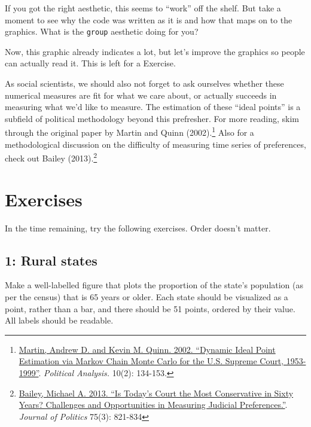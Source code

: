 \documentclass[]{book}
\newenvironment{Shaded}{\begin{snugshade}}{\end{snugshade}}
\let\rmarkdownfootnote\footnote%
\def\footnote{\protect\rmarkdownfootnote}
\theoremstyle{definition}
\theoremstyle{definition}
\theoremstyle{definition}
\theoremstyle{remark}
\begin{document}
\begin{Shaded}
\begin{Highlighting}[]
\begin{Shaded}
\begin{Highlighting}[]
\begin{Shaded}
\begin{Highlighting}[]
If you got the right aesthetic, this seems to ``work'' off the shelf. But take a moment to see why the code was written as it is and how that maps on to the graphics. What is the \texttt{group} aesthetic doing for you?

Now, this graphic already indicates a lot, but let's improve the graphics so people can actually read it. This is left for a Exercise.

As social scientists, we should also not forget to ask ourselves whether these numerical measures are fit for what we care about, or actually succeeds in measuring what we'd like to measure. The estimation of these ``ideal points'' is a subfield of political methodology beyond this prefresher. For more reading, skim through the original paper by Martin and Quinn (2002).\footnote{\href{http://mqscores.lsa.umich.edu/media/pa02.pdf}{Martin, Andrew D. and Kevin M. Quinn. 2002. ``Dynamic Ideal Point Estimation via Markov Chain Monte Carlo for the U.S. Supreme Court, 1953-1999''}. \emph{Political Analysis.} 10(2): 134-153.} Also for a methodological discussion on the difficulty of measuring time series of preferences, check out Bailey (2013).\footnote{\href{https://michaelbailey.georgetown.domains/wp-content/uploads/2018/05/JOP_proofs_June2013.pdf}{Bailey, Michael A. 2013. ``Is Today's Court the Most Conservative in Sixty Years? Challenges and Opportunities in Measuring Judicial Preferences.''}. \emph{Journal of Politics} 75(3): 821-834}

\hypertarget{exercises-2}{%
\section*{Exercises}\label{exercises-2}}

In the time remaining, try the following exercises. Order doesn't matter.

\hypertarget{rural-states}{%
\subsection*{1: Rural states}\label{rural-states}}

Make a well-labelled figure that plots the proportion of the state's population (as per the census) that is 65 years or older. Each state should be visualized as a point, rather than a bar, and there should be 51 points, ordered by their value. All labels should be readable.


\end{Highlighting}
\end{Shaded}
\end{Highlighting}
\end{Shaded}
\end{Highlighting}
\end{Shaded}
\end{document}
